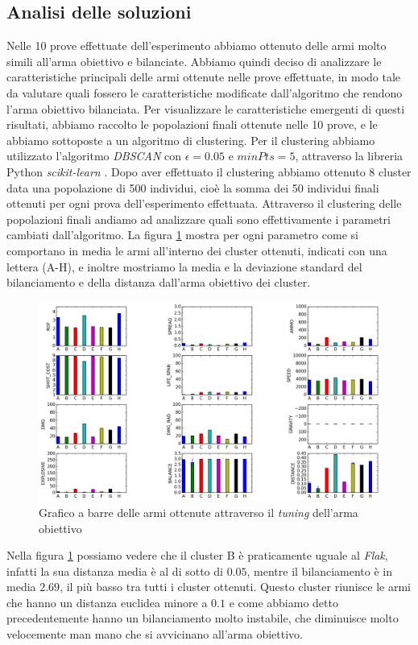 \documentclass[12pt, italian]{toptesi}
\begin{document}
\subsection{Analisi delle soluzioni}
Nelle 10 prove effettuate dell'esperimento abbiamo ottenuto delle armi molto simili all'arma obiettivo e bilanciate.
Abbiamo quindi deciso di analizzare le caratteristiche principali delle armi ottenute nelle prove effettuate, in modo tale da valutare quali fossero le caratteristiche modificate dall'algoritmo che rendono l'arma obiettivo bilanciata.
Per visualizzare le caratteristiche emergenti di questi risultati, abbiamo raccolto le popolazioni finali ottenute nelle 10 prove, e le abbiamo sottoposte a un algoritmo di clustering.
Per il clustering abbiamo utilizzato l'algoritmo \emph{DBSCAN} \cite{dbscan:article} con $\epsilon = 0.05$ e $minPts = 5$, attraverso la libreria {P}ython \emph{scikit-learn} \cite{scikit-learn:article}.
Dopo aver effettuato il clustering abbiamo ottenuto 8 cluster data una popolazione di 500 individui, cioè la somma dei 50 individui finali ottenuti per ogni prova dell'esperimento effettuata.
Attraverso il clustering delle popolazioni finali andiamo ad analizzare quali sono effettivamente i parametri cambiati dall'algoritmo.
La figura \ref{fig:bar_single_weap} mostra per ogni parametro come si comportano in media le armi all'interno dei cluster ottenuti, indicati con una lettera (A-H), e inoltre mostriamo la media e la deviazione standard del bilanciamento e della distanza dall'arma obiettivo dei cluster.
\begin{figure}[htp]
\centering
\includegraphics[width=1.2\textwidth, angle=90]{bar_single_weap}
\caption{Grafico a barre delle armi ottenute attraverso il \emph{tuning} dell'arma obiettivo}
\label{fig:bar_single_weap}
\end{figure}
Nella figura \ref{fig:bar_single_weap} possiamo vedere che il cluster B è praticamente uguale al \emph{Flak}, infatti la sua distanza media è al di sotto di $0.05$, mentre il bilanciamento è in media $2.69$, il più basso tra tutti i cluster ottenuti.
Questo cluster riunisce le armi che hanno un distanza euclidea minore a $0.1$ e come abbiamo detto precedentemente hanno un bilanciamento molto instabile, che diminuisce molto velocemente man mano che si avvicinano all'arma obiettivo.
\end{document}
